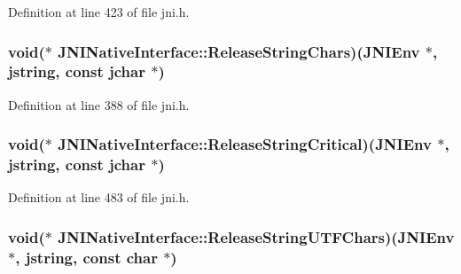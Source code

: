 Definition at line 423 of file jni.\-h.

\hypertarget{struct_j_n_i_native_interface_a363133db4d26ef8ed4accd23cb807089}{
\subsubsection[{Release\-String\-Chars}]{\setlength{\rightskip}{0pt plus 5cm}void($\ast$ J\-N\-I\-Native\-Interface\-::\-Release\-String\-Chars)({\bf J\-N\-I\-Env} $\ast$, {\bf jstring}, const {\bf jchar} $\ast$)}}\label{struct_j_n_i_native_interface_a363133db4d26ef8ed4accd23cb807089}


Definition at line 388 of file jni.\-h.

\hypertarget{struct_j_n_i_native_interface_a7ae8d5ebf8401b7490378ba1776afb40}{
\subsubsection[{Release\-String\-Critical}]{\setlength{\rightskip}{0pt plus 5cm}void($\ast$ J\-N\-I\-Native\-Interface\-::\-Release\-String\-Critical)({\bf J\-N\-I\-Env} $\ast$, {\bf jstring}, const {\bf jchar} $\ast$)}}\label{struct_j_n_i_native_interface_a7ae8d5ebf8401b7490378ba1776afb40}


Definition at line 483 of file jni.\-h.

\hypertarget{struct_j_n_i_native_interface_a011e2f8f4c7b025c37cc12795a5c65a4}{
\subsubsection[{Release\-String\-U\-T\-F\-Chars}]{\setlength{\rightskip}{0pt plus 5cm}void($\ast$ J\-N\-I\-Native\-Interface\-::\-Release\-String\-U\-T\-F\-Chars)({\bf J\-N\-I\-Env} $\ast$, {\bf jstring}, const char $\ast$)}}\label{struct_j_n_i_native_interface_a011e2f8f4c7b025c37cc12795a5c65a4}



